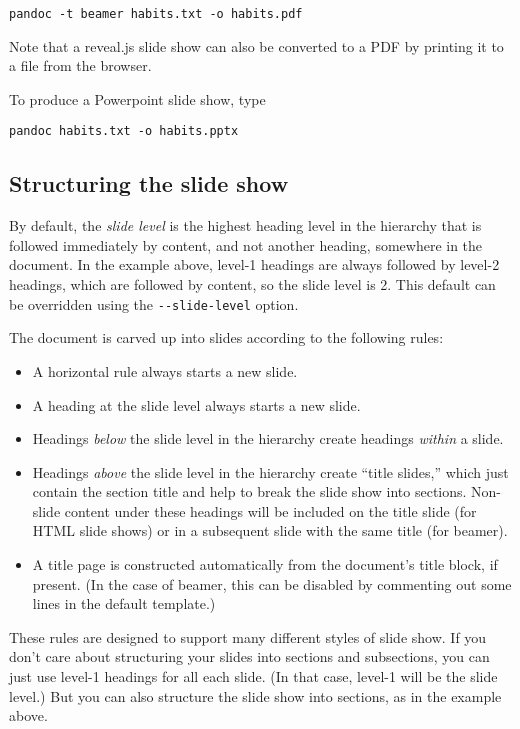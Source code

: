 \documentclass[]{article}
\begin{document}
\begin{verbatim}
pandoc -t beamer habits.txt -o habits.pdf
\end{verbatim}

Note that a reveal.js slide show can also be converted to a PDF by
printing it to a file from the browser.

To produce a Powerpoint slide show, type

\begin{verbatim}
pandoc habits.txt -o habits.pptx
\end{verbatim}

\hypertarget{structuring-the-slide-show}{%
\subsection{Structuring the slide
show}\label{structuring-the-slide-show}}

By default, the \emph{slide level} is the highest heading level in the
hierarchy that is followed immediately by content, and not another
heading, somewhere in the document. In the example above, level-1
headings are always followed by level-2 headings, which are followed by
content, so the slide level is 2. This default can be overridden using
the \texttt{-\/-slide-level} option.

The document is carved up into slides according to the following rules:

\begin{itemize}
\item
  A horizontal rule always starts a new slide.
\item
  A heading at the slide level always starts a new slide.
\item
  Headings \emph{below} the slide level in the hierarchy create headings
  \emph{within} a slide.
\item
  Headings \emph{above} the slide level in the hierarchy create ``title
  slides,'' which just contain the section title and help to break the
  slide show into sections. Non-slide content under these headings will
  be included on the title slide (for HTML slide shows) or in a
  subsequent slide with the same title (for beamer).
\item
  A title page is constructed automatically from the document's title
  block, if present. (In the case of beamer, this can be disabled by
  commenting out some lines in the default template.)
\end{itemize}

These rules are designed to support many different styles of slide show.
If you don't care about structuring your slides into sections and
subsections, you can just use level-1 headings for all each slide. (In
that case, level-1 will be the slide level.) But you can also structure
the slide show into sections, as in the example above.
\end{document}
